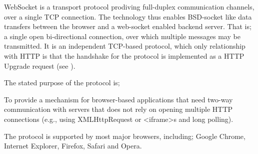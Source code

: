 WebSocket is a transport protocol prodiving full-duplex communication channels,
over a single \acs{TCP} connection. The technology thus enables BSD-socket like data
transfers between the browser and a web-socket enabled backend server. That is;
a single open bi-directional connection, over which multiple messages may be
transmitted.
\newline\newline
It is an independent \acs{TCP}-based protocol, which only relationship with \acs{HTTP} is
that the handshake for the protocol is implemented as a \acs{HTTP} Upgrade request
(see \citep{RFC6455}).

The stated purpose of the protocol is;
\begin{displayquote}
To provide a mechanism for browser-based applications that need two-way
communication with servers that does not rely on opening multiple \acs{HTTP}
connections (e.g., using XMLHttpRequest or <iframe>s and long polling).
\end{displayquote}
The protocol is supported by most major browsers, including; Google Chrome,
Internet Explorer, Firefox, Safari and Opera. 
